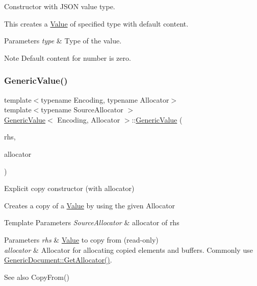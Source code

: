 Constructor with J\+S\+ON value type. 

This creates a \hyperlink{classValue}{Value} of specified type with default content. 
\begin{DoxyParams}{Parameters}
{\em type} & Type of the value. \\
\hline
\end{DoxyParams}
\begin{DoxyNote}{Note}
Default content for number is zero. 
\end{DoxyNote}
\mbox{\label{classGenericValue_a5161c0c98ba9144c50a38acde28a5ede}} 
\subsubsection{\texorpdfstring{Generic\+Value()}{GenericValue()}\hspace{0.1cm}{\footnotesize\ttfamily [2/8]}}
{\footnotesize\ttfamily template$<$typename Encoding, typename Allocator$>$ \\
template$<$typename Source\+Allocator $>$ \\
\hyperlink{classGenericValue}{Generic\+Value}$<$ Encoding, Allocator $>$\+::\hyperlink{classGenericValue}{Generic\+Value} (\begin{DoxyParamCaption}\item[{const \hyperlink{classGenericValue}{Generic\+Value}$<$ Encoding, Source\+Allocator $>$ \&}]{rhs,  }\item[{Allocator \&}]{allocator }\end{DoxyParamCaption})\hspace{0.3cm}{\ttfamily [inline]}}



Explicit copy constructor (with allocator) 

Creates a copy of a \hyperlink{classValue}{Value} by using the given Allocator 
\begin{DoxyTemplParams}{Template Parameters}
{\em Source\+Allocator} & allocator of {\ttfamily rhs} \\
\hline
\end{DoxyTemplParams}

\begin{DoxyParams}{Parameters}
{\em rhs} & \hyperlink{classValue}{Value} to copy from (read-\/only) \\
\hline
{\em allocator} & Allocator for allocating copied elements and buffers. Commonly use \hyperlink{classGenericDocument_aa4609d6b19f86aec1a6b96edf2c27686}{Generic\+Document\+::\+Get\+Allocator()}. \\
\hline
\end{DoxyParams}
\begin{DoxySeeAlso}{See also}
Copy\+From() 
\end{DoxySeeAlso}
\mbox{\label{classGenericValue_a88f02daf621c42b96d49d608fa9214de}} 
